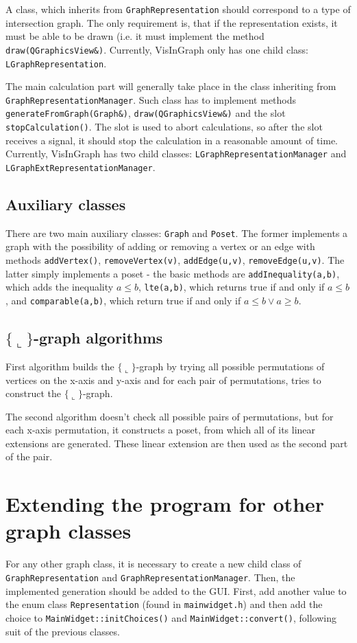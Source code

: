 \documentclass{article}
\begin{document}
A class, which inherits from \texttt{GraphRepresentation} should correspond to a type of intersection graph.
The only requirement is, that if the representation exists, it must be able to be drawn (i.e. it must implement the method \texttt{draw(QGraphicsView\&)}.
Currently, VisInGraph only has one child class: \texttt{LGraphRepresentation}.

The main calculation part will generally take place in the class inheriting from \texttt{GraphRepresentationManager}.
Such class has to implement methods \texttt{generateFromGraph(Graph\&)}, \texttt{draw(QGraphicsView\&)} and the slot \texttt{stopCalculation()}.
The slot is used to abort calculations, so after the slot receives a signal, it should stop the calculation in a reasonable amount of time.
Currently, VisInGraph has two child classes: \texttt{LGraphRepresentationManager} and \texttt{LGraphExtRepresentationManager}.


\subsection{Auxiliary classes}
There are two main auxiliary classes: \texttt{Graph} and \texttt{Poset}.
The former implements a graph with the possibility of adding or removing a vertex or an edge with methods \texttt{addVertex()}, \texttt{removeVertex(v)}, \texttt{addEdge(u,v)}, \texttt{removeEdge(u,v)}.
The latter simply implements a poset - the basic methods are \texttt{addInequality(a,b)}, which adds the inequality $a\leq b$, \texttt{lte(a,b)}, which returns true if and only if $a\leq b$, and \texttt{comparable(a,b)}, which return true if and only if $a\leq b\lor a\geq b$.


\subsection{$\{\llcorner\}$-graph algorithms}
First algorithm builds the $\{\llcorner\}$-graph by trying all possible permutations of vertices on the x-axis and y-axis and for each pair of permutations, tries to construct the $\{\llcorner\}$-graph.

The second algorithm doesn't check all possible pairs of permutations, but for each x-axis permutation, it constructs a poset, from which all of its linear extensions are generated.
These linear extension are then used as the second part of the pair.


\section{Extending the program for other graph classes}
For any other graph class, it is necessary to create a new child class of \texttt{GraphRepresentation} and \texttt{GraphRepresentationManager}.
Then, the implemented generation should be added to the GUI.
First, add another value to the enum class \texttt{Representation} (found in \texttt{mainwidget.h}) and then add the choice to \texttt{MainWidget::initChoices()} and \texttt{MainWidget::convert()}, following suit of the previous classes.
\end{document}
